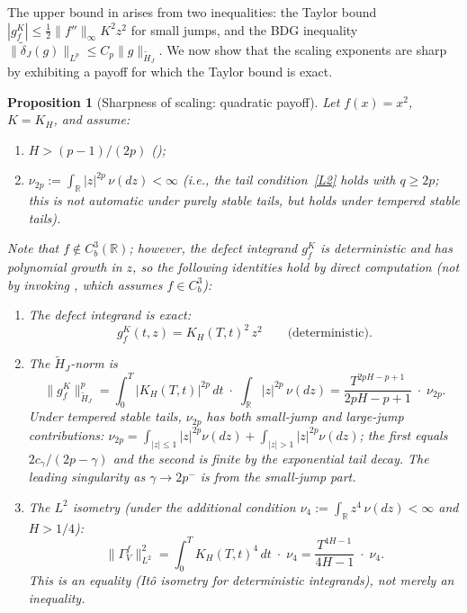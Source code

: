 \documentclass[11pt,a4paper]{article}
\theoremstyle{plain}
\newtheorem{proposition}[theorem]{Proposition}
\theoremstyle{definition}
\theoremstyle{remark}
\newcommand{\R}{\mathbb{R}}
\begin{document}
The upper bound in  arises from two
inequalities: the Taylor bound $|g_f^K| \leq
\frac{1}{2}\|f''\|_\infty K^2 z^2$ for small jumps, and
the BDG inequality $\|\widetilde{\delta}_J(g)\|_{L^p}
\leq C_p\|g\|_{\widetilde{H}_J}$.  We now show
that the scaling exponents are sharp by exhibiting a payoff
for which the Taylor bound is exact.

\begin{proposition}[Sharpness of scaling: quadratic payoff]
\label{thm:sharpness}
Let $f(x) = x^2$, $K = K_H$, and assume:
\begin{enumerate}[label=(\roman*)]
\item $H > (p-1)/(2p)$ ();
\item $\nu_{2p} := \int_\R |z|^{2p}\,\nu(dz) < \infty$
  (i.e., the tail condition~\ref{L2} holds with $q \geq 2p$;
  this is \emph{not} automatic under purely stable tails,
  but holds under tempered stable tails).
\end{enumerate}
Note that $f \notin C_b^3(\R)$; however, the defect
integrand $g_f^K$ is deterministic and has polynomial
growth in $z$, so the following identities hold by
direct computation (not by invoking ,
which assumes $f \in C_b^3$):
\begin{enumerate}[label=(\alph*)]
\item The defect integrand is exact:
  \begin{equation}\label{eq:gfK-exact}
    g_f^K(t,z) = K_H(T,t)^2\,z^2
    \qquad \text{(deterministic)}.
  \end{equation}
\item The $\widetilde{H}_J$-norm is
  \begin{equation}\label{eq:gfK-exact-norm}
    \|g_f^K\|_{\widetilde{H}_J}^p
    = \int_0^T |K_H(T,t)|^{2p}\,dt
    \;\cdot\;\int_\R |z|^{2p}\,\nu(dz)
    = \frac{T^{2pH - p + 1}}{2pH - p + 1}
    \;\cdot\;\nu_{2p}.
  \end{equation}
  Under tempered stable tails, $\nu_{2p}$ has both small-jump
  and large-jump contributions:
  $\nu_{2p} = \int_{|z|\leq 1}|z|^{2p}\nu(dz)
  + \int_{|z|>1}|z|^{2p}\nu(dz)$;
  the first equals $2c_\gamma/(2p-\gamma)$ and the second
  is finite by the exponential tail decay.  The leading
  singularity as $\gamma \to 2p^-$ is from the small-jump
  part.
\item The $L^2$ isometry (under the additional condition
  $\nu_4 := \int_\R z^4\,\nu(dz) < \infty$ and $H > 1/4$):
  \begin{equation}\label{eq:Gamma-L2}
    \|\Gamma_V^f\|_{L^2}^2
    = \int_0^T K_H(T,t)^4\,dt\;\cdot\;\nu_4
    = \frac{T^{4H-1}}{4H - 1}\;\cdot\;\nu_4.
  \end{equation}
  This is an \emph{equality} (It\^o isometry for
  deterministic integrands), not merely an inequality.
\end{enumerate}
\end{proposition}
\end{document}
